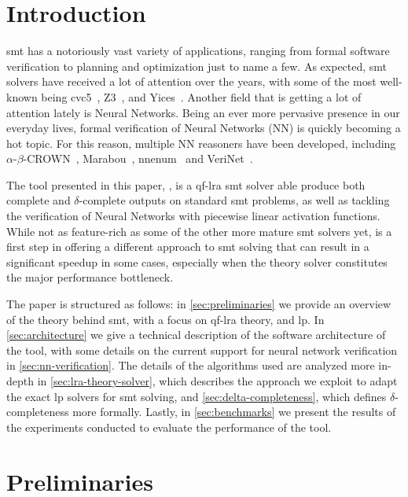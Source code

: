 \documentclass[runningheads]{llncs}
\begin{document}
\section{Introduction}

\gls{smt} has a notoriously vast variety of applications, ranging from formal software verification to planning and optimization just to name a few.
As expected, \gls{smt} solvers have received a lot of attention over the years, with some of the most well-known being cvc5~\cite{ref:cvc5}, Z3~\cite{ref:z3}, and Yices~\cite{ref:yices}.
Another field that is getting a lot of attention lately is Neural Networks.
Being an ever more pervasive presence in our everyday lives, formal verification of Neural Networks (NN) is quickly becoming a hot topic.
For this reason, multiple NN reasoners have been developed, including $\alpha$-$\beta$-CROWN~\cite{ref:a-crown,ref:b-crown,ref:crown,ref:lirpa}, Marabou~\cite{ref:marabou}, nnenum~\cite{ref:nnenum} and VeriNet~\cite{ref:verinet}.

The tool presented in this paper, \dlinear, is a \gls{qf-lra} \gls{smt} solver able produce both complete and $\delta$-complete outputs on standard \gls{smt} problems,
as well as tackling the verification of Neural Networks with piecewise linear activation functions.
While not as feature-rich as some of the other more mature \gls{smt} solvers yet, \dlinear is a first step in offering a different approach to \gls{smt} solving that can result in a significant speedup in some cases, especially when the theory solver constitutes the major performance bottleneck.

The paper is structured as follows: in \autoref{sec:preliminaries} we provide an overview of the theory behind \gls{smt}, with a focus on \gls{qf-lra} theory, and \gls{lp}.
In \autoref{sec:architecture} we give a technical description of the software architecture of the tool, with some details on the current support for neural network verification in \autoref{sec:nn-verification}.
The details of the algorithms used are analyzed more in-depth in \autoref{sec:lra-theory-solver}, which describes the approach we exploit to adapt the exact \gls{lp} solvers for \gls{smt} solving, and \autoref{sec:delta-completeness}, which defines $\delta$-completeness more formally.
Lastly, in \autoref{sec:benchmarks} we present the results of the experiments conducted to evaluate the performance of the tool.

\section{Preliminaries}
\label{sec:preliminaries}
\end{document}
